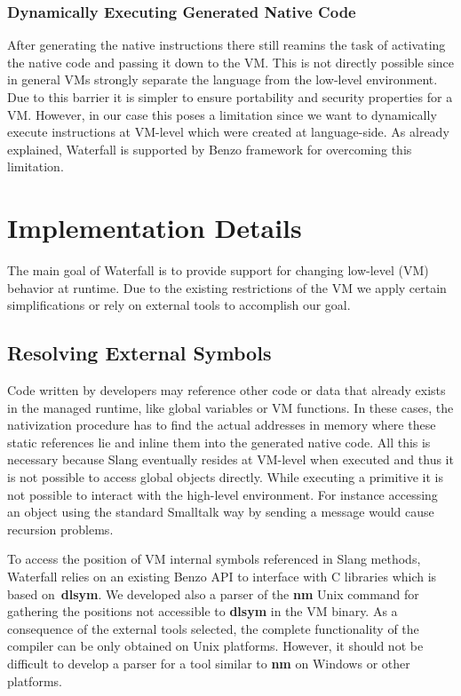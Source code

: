 \documentclass[10pt,preprint,letter]{sigplanconf}
\newcommand{\ST}  {Small\-talk\xspace}
\newcommand{\W}{Waterfall\xspace}
\newcommand{\B}{Benzo\xspace}
\begin{document}
\subsubsection{Dynamically Executing Generated Native Code} 
After generating the native instructions there still reamins the task of activating the native code and passing it down to the VM.
This is not directly possible since in general VMs strongly separate the language from the low-level environment.
Due to this barrier it is simpler to ensure portability and security properties for a VM.
However, in our case this poses a limitation since we want to dynamically execute instructions at VM-level which were created at language-side.
As already explained, \W is supported by \B framework for overcoming this limitation.


\section{Implementation Details} \label{sec:implementation}
The main goal of \W  is to provide support for changing low-level (VM) behavior at runtime.
Due to the existing restrictions of the VM we apply certain simplifications or rely on external tools to accomplish our goal.


\subsection{Resolving External Symbols} 
Code written by developers may reference other code or data that already exists in the managed runtime, like global variables or VM functions.
In these cases, the nativization procedure has to find the actual addresses in memory where these static references lie and inline them into the generated native code.
All this is necessary because Slang eventually resides at VM-level when executed and thus it is not possible to access global objects directly.
While executing a primitive it is not possible to interact with the high-level environment. 
For instance accessing an object using the standard \ST way by sending a message would cause recursion problems.

To access the position of VM internal symbols referenced in Slang methods, \W relies on an existing \B API to interface with C libraries which is based on~\textbf{dlsym}. 
We developed also a parser of the \textbf{nm} Unix command for gathering the positions not accessible to \textbf{dlsym} in the VM binary. 
As a consequence of the external tools selected, the complete functionality of the compiler can be only obtained on Unix platforms. 
However, it should not be difficult to develop a parser for a  tool similar to \textbf{nm} on Windows or other platforms.
\end{document}
